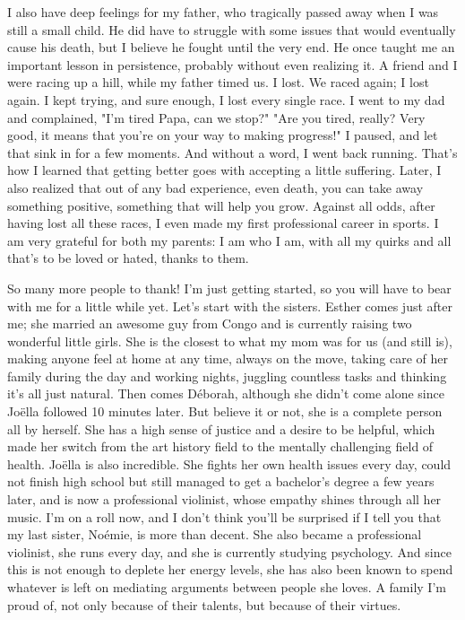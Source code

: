 I also have deep feelings for my father, who tragically passed away when I was still a small child. He did have to struggle with some issues that would eventually cause his death, but I believe he fought until the very end. He once taught me an important lesson in persistence, probably without even realizing it. A friend and I were racing up a hill, while my father timed us. I lost. We raced again; I lost again. I kept trying, and sure enough, I lost every single race. I went to my dad and complained, "I’m tired Papa, can we stop?" "Are you tired, really? Very good, it means that you’re on your way to making progress!" I paused, and let that sink in for a few moments. And without a word, I went back running. That’s how I learned that getting better goes with accepting a little suffering. Later, I also realized that out of any bad experience, even death, you can take away something positive, something that will help you grow. Against all odds, after having lost all these races, I even made my first professional career in sports. I am very grateful for both my parents: I am who I am, with all my quirks and all that’s to be loved or hated, thanks to them.

So many more people to thank! I’m just getting started, so you will have to bear with me for a little while yet. Let’s start with the sisters. Esther comes just after me; she married an awesome guy from Congo and is currently raising two wonderful little girls. She is the closest to what my mom was for us (and still is), making anyone feel at home at any time, always on the move, taking care of her family during the day and working nights, juggling countless tasks and thinking it’s all just natural. Then comes Déborah, although she didn’t come alone since Joëlla followed 10 minutes later. But believe it or not, she is a complete person all by herself. She has a high sense of justice and a desire to be helpful, which made her switch from the art history field to the mentally challenging field of health. Joëlla is also incredible. She fights her own health issues every day, could not finish high school but still managed to get a bachelor’s degree a few years later, and is now a professional violinist, whose empathy shines through all her music. I’m on a roll now, and I don’t think you’ll be surprised if I tell you that my last sister, Noémie, is more than decent. She also became a professional violinist, she runs every day, and she is currently studying psychology. And since this is not enough to deplete her energy levels, she has also been known to spend whatever is left on mediating arguments between people she loves. A family I’m proud of, not only because of their talents, but because of their virtues.

